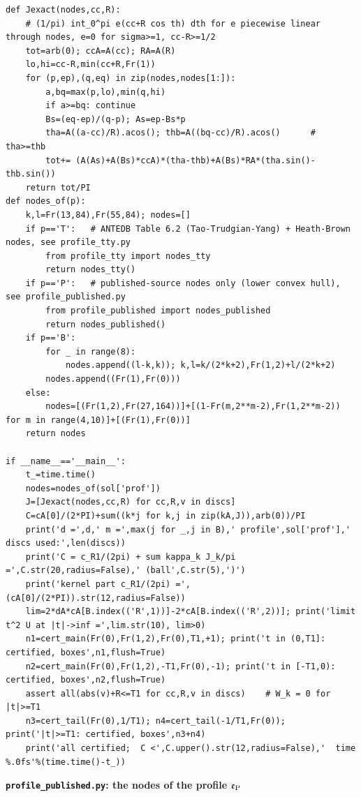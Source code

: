 \documentclass[11pt,reqno]{amsart}
\numberwithin{equation}{section}
\theoremstyle{definition}
\theoremstyle{remark}
\newcommand{\appsub}[1]{\par\medskip\noindent\textbf{#1}\par\nobreak\smallskip}
\begin{document}
\begin{lstlisting}
def Jexact(nodes,cc,R):
    # (1/pi) int_0^pi e(cc+R cos th) dth for e piecewise linear through nodes, e=0 for sigma>=1, cc-R>=1/2
    tot=arb(0); ccA=A(cc); RA=A(R)
    lo,hi=cc-R,min(cc+R,Fr(1))
    for (p,ep),(q,eq) in zip(nodes,nodes[1:]):
        a,bq=max(p,lo),min(q,hi)
        if a>=bq: continue
        Bs=(eq-ep)/(q-p); As=ep-Bs*p
        tha=A((a-cc)/R).acos(); thb=A((bq-cc)/R).acos()      # tha>=thb
        tot+= (A(As)+A(Bs)*ccA)*(tha-thb)+A(Bs)*RA*(tha.sin()-thb.sin())
    return tot/PI
def nodes_of(p):
    k,l=Fr(13,84),Fr(55,84); nodes=[]
    if p=='T':   # ANTEDB Table 6.2 (Tao-Trudgian-Yang) + Heath-Brown nodes, see profile_tty.py
        from profile_tty import nodes_tty
        return nodes_tty()
    if p=='P':   # published-source nodes only (lower convex hull), see profile_published.py
        from profile_published import nodes_published
        return nodes_published()
    if p=='B':
        for _ in range(8):
            nodes.append((l-k,k)); k,l=k/(2*k+2),Fr(1,2)+l/(2*k+2)
        nodes.append((Fr(1),Fr(0)))
    else:
        nodes=[(Fr(1,2),Fr(27,164))]+[(1-Fr(m,2**m-2),Fr(1,2**m-2)) for m in range(4,10)]+[(Fr(1),Fr(0))]
    return nodes

if __name__=='__main__':
    t_=time.time()
    nodes=nodes_of(sol['prof'])
    J=[Jexact(nodes,cc,R) for cc,R,v in discs]
    C=cA[0]/(2*PI)+sum((k*j for k,j in zip(kA,J)),arb(0))/PI
    print('d =',d,' m =',max(j for _,j in B),' profile',sol['prof'],' discs used:',len(discs))
    print('C = c_R1/(2pi) + sum kappa_k J_k/pi =',C.str(20,radius=False),' (ball',C.str(5),')')
    print('kernel part c_R1/(2pi) =',(cA[0]/(2*PI)).str(12,radius=False))
    lim=2*dA*cA[B.index(('R',1))]-2*cA[B.index(('R',2))]; print('limit t^2 U at |t|->inf =',lim.str(10), lim>0)
    n1=cert_main(Fr(0),Fr(1,2),Fr(0),T1,+1); print('t in (0,T1]: certified, boxes',n1,flush=True)
    n2=cert_main(Fr(0),Fr(1,2),-T1,Fr(0),-1); print('t in [-T1,0): certified, boxes',n2,flush=True)
    assert all(abs(v)+R<=T1 for cc,R,v in discs)    # W_k = 0 for |t|>=T1
    n3=cert_tail(Fr(0),1/T1); n4=cert_tail(-1/T1,Fr(0)); print('|t|>=T1: certified, boxes',n3+n4)
    print('all certified;  C <',C.upper().str(12,radius=False),'  time %.0fs'%(time.time()-t_))
\end{lstlisting}
\appsub{\texttt{profile\_published.py}: the nodes of the profile $\mathfrak e_{\rm P}$}
\label{app:profile}
\end{document}
